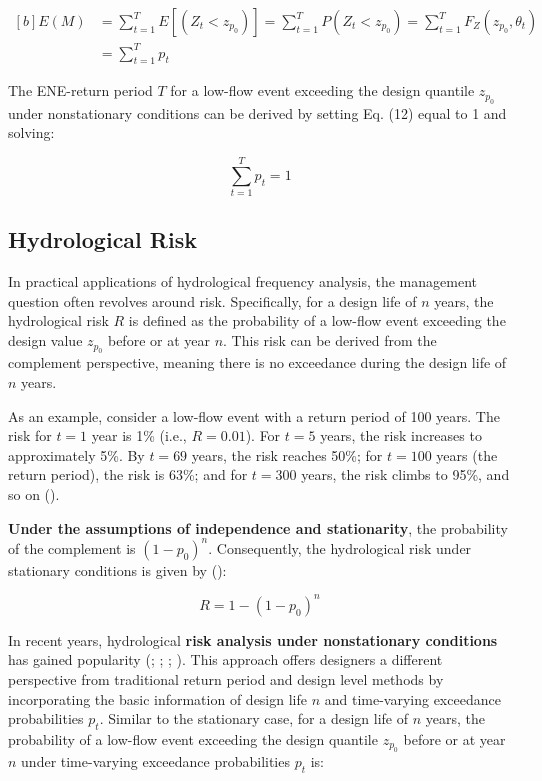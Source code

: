 \documentclass[
]{krantz}
\begin{document}
\[
\begin{aligned}[b]
E(M) & =\sum_{t=1}^{T} E\left[\left(Z_{t}<z_{p_{0}}\right)\right]=\sum_{t=1}^{T} P\left(Z_{t}<z_{p_{0}}\right)=\sum_{t=1}^{T} F_{Z}\left(z_{p_{0}}, {\theta}_{t}\right) \\
& =\sum_{t=1}^{T} p_{t} 
\end{aligned}\tag{12}
\]

The ENE-return period \(T\) for a low-flow event exceeding the design quantile \(z_{p_{0}}\) under nonstationary conditions can be derived by setting Eq. (12) equal to 1 and solving:

\[
\sum_{t=1}^{T} p_{t}=1 \tag{13} 
\]

\subsection{Hydrological Risk}\label{hydrological-risk}

In practical applications of hydrological frequency analysis, the management question often revolves around risk. Specifically, for a design life of \(n\) years, the hydrological risk \(R\) is defined as the probability of a low-flow event exceeding the design value \(z_{p_{0}}\) before or at year \(n\). This risk can be derived from the complement perspective, meaning there is no exceedance during the design life of \(n\) years.

As an example, consider a low-flow event with a return period of 100 years. The risk for \(t=1\) year is 1\% (i.e., \(R=0.01\)). For \(t=5\) years, the risk increases to approximately 5\%. By \(t=69\) years, the risk reaches 50\%; for \(t=100\) years (the return period), the risk is 63\%; and for \(t=300\) years, the risk climbs to 95\%, and so on (\citet{Wigley2009}).

\textbf{Under the assumptions of independence and stationarity}, the probability of the complement is \(\left(1-p_{0}\right)^{n}\). Consequently, the hydrological risk under stationary conditions is given by (\citet{Haan2002}):

\[
R=1-\left(1-p_{0}\right)^{n} \tag{14}
\]

In recent years, hydrological \textbf{risk analysis under nonstationary conditions} has gained popularity (\citet{Rootzen2013}; \citet{Salas2014}; \citet{Condon2015}; \citet{Serinaldi2015}). This approach offers designers a different perspective from traditional return period and design level methods by incorporating the basic information of design life \(n\) and time-varying exceedance probabilities \(p_{t}\). Similar to the stationary case, for a design life of \(n\) years, the probability of a low-flow event exceeding the design quantile \(z_{p_{0}}\) before or at year \(n\) under time-varying exceedance probabilities \(p_{t}\) is:
\end{document}
